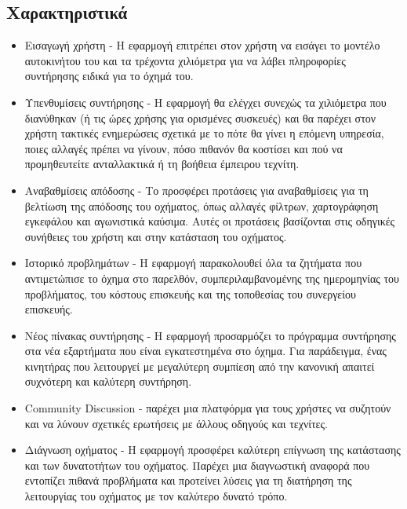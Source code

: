\documentclass[11pt]{scrartcl} %
\begin{document}
\subsection*{Χαρακτηριστικά}
\begin{itemize}
    \item Εισαγωγή χρήστη - Η εφαρμογή επιτρέπει στον χρήστη να εισάγει το μοντέλο αυτοκινήτου του και τα τρέχοντα χιλιόμετρα για να λάβει πληροφορίες συντήρησης ειδικά για το όχημά του.
    \item Υπενθυμίσεις συντήρησης - Η εφαρμογή θα ελέγχει συνεχώς τα χιλιόμετρα που διανύθηκαν (ή τις ώρες χρήσης για ορισμένες συσκευές) και θα παρέχει στον χρήστη τακτικές ενημερώσεις σχετικά με το πότε θα γίνει η επόμενη υπηρεσία, ποιες αλλαγές πρέπει να γίνουν, πόσο πιθανόν θα κοστίσει και πού να προμηθευτείτε ανταλλακτικά ή τη βοήθεια έμπειρου τεχνίτη.
    \item Αναβαθμίσεις απόδοσης - Το  προσφέρει προτάσεις για αναβαθμίσεις για τη βελτίωση της απόδοσης του οχήματος, όπως αλλαγές φίλτρων, χαρτογράφηση εγκεφάλου και αγωνιστικά καύσιμα. Αυτές οι προτάσεις βασίζονται στις οδηγικές συνήθειες του χρήστη και στην κατάσταση του οχήματος.
    \item Ιστορικό προβλημάτων - Η εφαρμογή παρακολουθεί όλα τα ζητήματα που αντιμετώπισε το όχημα στο παρελθόν, συμπεριλαμβανομένης της ημερομηνίας του προβλήματος, του κόστους επισκευής και της τοποθεσίας του συνεργείου επισκευής.
    \item Νέος πίνακας συντήρησης - Η εφαρμογή προσαρμόζει το πρόγραμμα συντήρησης στα νέα εξαρτήματα που είναι εγκατεστημένα στο όχημα. Για παράδειγμα, ένας κινητήρας που λειτουργεί με μεγαλύτερη συμπίεση από την κανονική απαιτεί συχνότερη και καλύτερη συντήρηση.
    \item Community Discussion -  παρέχει μια πλατφόρμα για τους χρήστες να συζητούν και να λύνουν σχετικές ερωτήσεις με άλλους οδηγούς και τεχνίτες.
    \item Διάγνωση οχήματος - Η εφαρμογή προσφέρει καλύτερη επίγνωση της κατάστασης και των δυνατοτήτων του οχήματος. Παρέχει μια διαγνωστική αναφορά που εντοπίζει πιθανά προβλήματα και προτείνει λύσεις για τη διατήρηση της λειτουργίας του οχήματος με τον καλύτερο δυνατό τρόπο.
\end{itemize}
\end{document}
